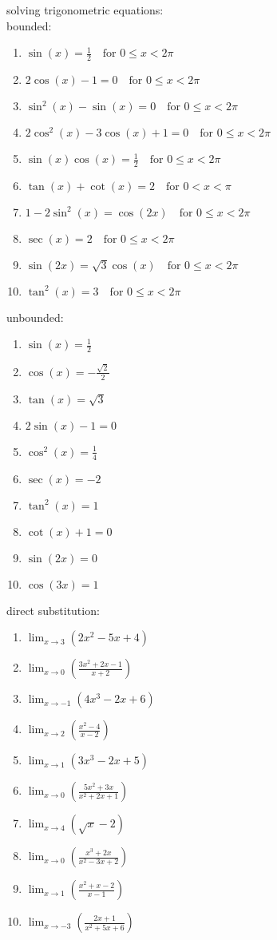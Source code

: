 \documentclass{article}
\begin{document}
solving trigonometric equations:\\
bounded:
\begin{enumerate}
	\item $ \sin(x) = \frac{1}{2} \quad \text{for } 0 \leq x < 2\pi $  
	\item $ 2\cos(x) - 1 = 0 \quad \text{for } 0 \leq x < 2\pi $ 
	\item $ \sin^2(x) - \sin(x) = 0 \quad \text{for } 0 \leq x < 2\pi $ 
	\item $ 2\cos^2(x) - 3\cos(x) + 1 = 0 \quad \text{for } 0 \leq x < 2\pi $ 
	\item $ \sin(x)\cos(x) = \frac{1}{2} \quad \text{for } 0 \leq x < 2\pi $ 
	\item $ \tan(x) + \cot(x) = 2 \quad \text{for } 0 < x < \pi $ 
	\item $ 1 - 2\sin^2(x) = \cos(2x) \quad \text{for } 0 \leq x < 2\pi $ 
	\item $ \sec(x) = 2 \quad \text{for } 0 \leq x < 2\pi $ 
	\item $ \sin(2x) = \sqrt{3}\cos(x) \quad \text{for } 0 \leq x < 2\pi $
	\item $ \tan^2(x) = 3 \quad \text{for } 0 \leq x < 2\pi $
\end{enumerate}
unbounded:
\begin{enumerate}
  \item $\sin(x)=\frac{1}{2}$
  \item $\cos(x)=-\frac{\sqrt{2}}{2}$
  \item $\tan(x)=\sqrt{3}$
  \item $2\sin(x)-1=0$
  \item $\cos^2(x)=\frac{1}{4}$
  \item $\sec(x)=-2$
  \item $\tan^2(x)=1$
  \item $\cot(x)+1=0$
  \item $\sin(2x)=0$
  \item $\cos(3x)=1$
\end{enumerate}

direct substitution:
\begin{enumerate}
	\item $\lim_{x \to 3} \left( 2x^2 - 5x + 4 \right)$
	\item $\lim_{x \to 0} \left( \frac{3x^2 + 2x - 1}{x + 2} \right)$
        \item $\lim_{x \to -1} \left( 4x^3 - 2x + 6 \right)$
	\item $\lim_{x \to 2} \left( \frac{x^2 - 4}{x - 2} \right)$
	\item $\lim_{x \to 1} \left( 3x^3 - 2x + 5 \right)$
	\item $\lim_{x \to 0} \left( \frac{5x^2 + 3x}{x^2 + 2x + 1} \right)$
	\item $\lim_{x \to 4} \left( \sqrt{x} - 2 \right)$
	\item $\lim_{x \to 0} \left( \frac{x^3 + 2x}{x^2 - 3x + 2} \right)$
	\item $\lim_{x \to 1} \left( \frac{x^2 + x - 2}{x - 1} \right)$
	\item $\lim_{x \to -3} \left( \frac{2x + 1}{x^2 + 5x + 6} \right)$
\end{enumerate}
\end{document}
